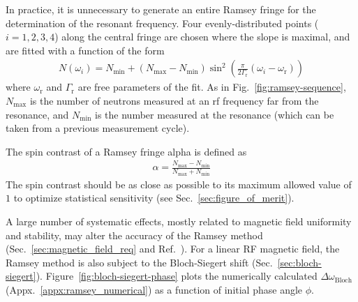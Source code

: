In practice, it is unnecessary to generate an entire Ramsey fringe for the determination of the resonant frequency. Four evenly-distributed points ($i=1,2,3,4$) along the central fringe are chosen where the slope is maximal, and are fitted with a function of the form~\cite{may_thesis}
%
\begin{gather}
    N(\omega_i)=N_\text{min} + (N_\text{max}-N_\text{min})\sin^2\left(\frac{\pi}{2\Gamma_\text{r}}(\omega_i-\omega_\text{r}) \right)
\end{gather}
%
where $\omega_\text{r}$ and $\Gamma_\text{r}$ are free parameters of the fit. As in Fig.~\ref{fig:ramsey-sequence}, $N_\text{max}$ is the number of neutrons measured at an \acrshort*{rf} frequency far from the resonance, and $N_\text{min}$ is the number measured at the resonance (which can be taken from a previous measurement cycle).

The spin contrast of a Ramsey fringe \gls*{alpha} is defined as
%
\begin{gather}
    \alpha = \frac{N_\text{max} - N_\text{min}} {N_\text{max} + N_\text{min}} \label{eq:alpha}
\end{gather}
%
The spin contrast should be as close as possible to its maximum allowed value of $1$ to optimize statistical sensitivity (see Sec.~\ref{sec:figure_of_merit}).

A large number of systematic effects, mostly related to magnetic field uniformity and stability, may alter the accuracy of the Ramsey method (Sec.~\ref{sec:magnetic_field_req} and Ref.~\cite{abel_magnetic-field_2019}). For a linear RF magnetic field, the Ramsey method is also subject to the Bloch-Siegert shift (Sec.~\ref{sec:bloch-siegert}). Figure~\ref{fig:bloch-siegert-phase} plots the numerically calculated $\Delta\omega_\text{Bloch}$ (Appx.~\ref{appx:ramsey_numerical}) as a function of initial phase angle $\phi$.

